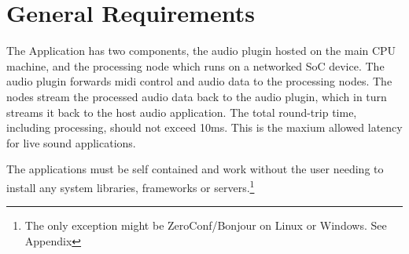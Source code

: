 \section{General Requirements}

The Application has two components, the audio plugin hosted on the main CPU machine, and the processing node which runs on a networked SoC device. The audio plugin forwards midi control and audio data to the processing nodes. The nodes stream the processed audio data back to the audio plugin, which in turn streams it back to the host audio application. The total round-trip time, including processing, should not exceed 10ms. This is the maxium allowed latency for live sound applications. \cite{AES67-2013}

The applications must be self contained and work without the user needing to install any system libraries, frameworks or servers.\footnote{The only exception might be ZeroConf/Bonjour on Linux or Windows. See Appendix}

